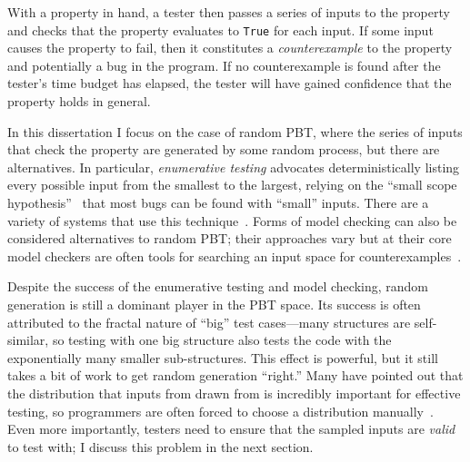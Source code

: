 With a property in hand, a tester then passes a series of inputs to the property
and checks that the property evaluates to \lstinline{True} for each input.  If
some input causes the property to fail, then it constitutes a {\em
counterexample} to the property and potentially a bug in the program. If no
counterexample is found after the tester's time budget has elapsed, the tester
will have gained confidence that the property holds in general.

In this dissertation I focus on the case of random PBT, where the series of
inputs that check the property are generated by some random process, but there
are alternatives. In particular, {\em enumerative testing} advocates
deterministically listing every possible input from the smallest to the largest,
relying on the ``small scope hypothesis''~\cite{jackson1996elements} that most
bugs can be found with ``small'' inputs. There are a variety of systems that use
this technique~\cite{DBLP:conf/haskell/RuncimanNL08,leancheck}. Forms of model
checking can also be considered alternatives to random PBT; their approaches
vary but at their core model checkers are often tools for searching an input
space for counterexamples~\cite{biere2009bounded}.

Despite the success of the enumerative testing and model checking, random
generation is still a dominant player in the PBT space. Its success is often
attributed to the fractal nature of ``big'' test cases---many structures are
self-similar, so testing with one big structure also tests the code with the
exponentially many smaller sub-structures. This effect is powerful, but it still
takes a bit of work to get random generation ``right.'' Many have pointed out
that the distribution that inputs from drawn from is incredibly important for
effective testing, so programmers are often forced to choose a distribution
manually~\cite{DBLP:conf/icfp/ClaessenH00}. Even more importantly, testers need
to ensure that the sampled inputs are {\em valid} to test with; I discuss this
problem in the next section.



%



